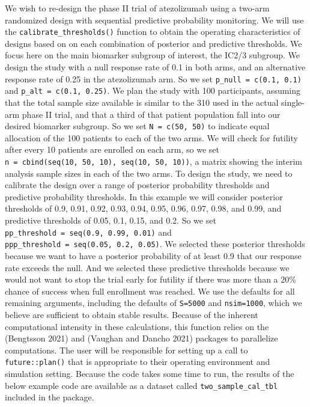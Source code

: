 We wish to re-design the phase II trial of atezolizumab using a two-arm randomized design with sequential predictive probability monitoring. We will use the \texttt{calibrate\_thresholds()} function to obtain the operating characteristics of designs based on on each combination of posterior and predictive thresholds. We focus here on the main biomarker subgroup of interest, the IC2/3 subgroup. We design the study with a null response rate of 0.1 in both arms, and an alternative response rate of 0.25 in the atezolizumab arm. So we set \texttt{p\_null\ =\ c(0.1,\ 0.1)} and \texttt{p\_alt\ =\ c(0.1,\ 0.25)}. We plan the study with 100 participants, assuming that the total sample size available is similar to the 310 used in the actual single-arm phase II trial, and that a third of that patient population fall into our desired biomarker subgroup. So we set \texttt{N\ =\ c(50,\ 50)} to indicate equal allocation of the 100 patients to each of the two arms. We will check for futility after every 10 patients are enrolled on each arm, so we set \texttt{n\ =\ cbind(seq(10,\ 50,\ 10),\ seq(10,\ 50,\ 10))}, a matrix showing the interim analysis sample sizes in each of the two arms. To design the study, we need to calibrate the design over a range of posterior probability thresholds and predictive probability thresholds. In this example we will consider posterior thresholds of 0.9, 0.91, 0.92, 0.93, 0.94, 0.95, 0.96, 0.97, 0.98, and 0.99, and predictive thresholds of 0.05, 0.1, 0.15, and 0.2. So we set \texttt{pp\_threshold\ =\ seq(0.9,\ 0.99,\ 0.01)} and \texttt{ppp\_threshold\ =\ seq(0.05,\ 0.2,\ 0.05)}. We selected these posterior thresholds because we want to have a posterior probability of at least 0.9 that our response rate exceeds the null. And we selected these predictive thresholds because we would not want to stop the trial early for futility if there was more than a 20\% chance of success when full enrollment was reached. We use the defaults for all remaining arguments, including the defaults of \texttt{S=5000} and \texttt{nsim=1000}, which we believe are sufficient to obtain stable results. Because of the inherent computational intensity in these calculations, this function relies on the  (Bengtsson 2021) and  (Vaughan and Dancho 2021) packages to parallelize computations. The user will be responsible for setting up a call to \texttt{future::plan()} that is appropriate to their operating environment and simulation setting. Because the code takes some time to run, the results of the below example code are available as a dataset called \texttt{two\_sample\_cal\_tbl} included in the  package.

